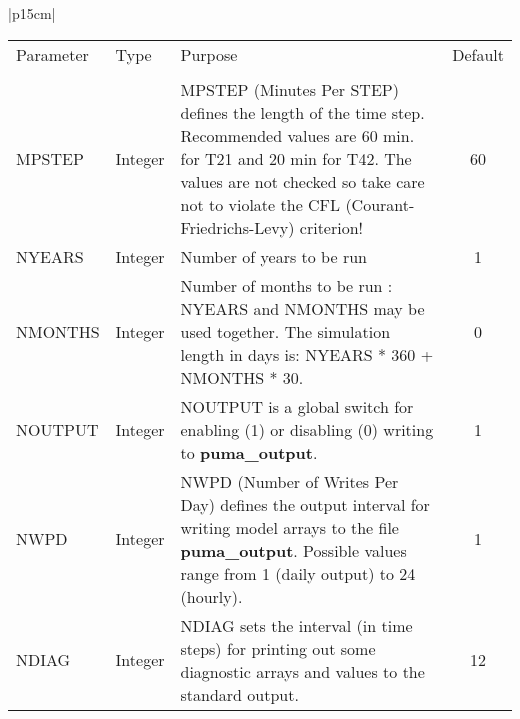\begin{center}
\begin{tabular}{|p{15cm}|}
\begin{center}
\begin{tabular}{l l p{6cm} c}
Parameter & Type & Purpose & Default \\
&&&\\
MPSTEP & Integer & MPSTEP (Minutes Per STEP) defines the length of the
                   time step. Recommended values are 60 min. for T21
                   and 20 min for T42. The values are not checked
                   so take care not to violate the CFL
                   (Courant-Friedrichs-Levy) criterion!  & 60 \\
NYEARS  & Integer & Number of years to be run & 1 \\
NMONTHS & Integer & Number of months to be run : NYEARS and NMONTHS
                    may be used together. The simulation length in
                    days is: NYEARS * 360 + NMONTHS * 30.  & 0 \\
NOUTPUT & Integer & NOUTPUT is a global switch for enabling (1)
                    or disabling (0) writing to {\bf puma\_output}.   & 1 \\
NWPD    & Integer & NWPD (Number of Writes Per Day) defines the
                    output interval for writing model arrays to the
                    file {\bf puma\_output}. Possible values range
                    from 1 (daily output) to 24 (hourly).   & 1 \\
NDIAG   & Integer & NDIAG sets the interval (in time steps) for 
                    printing out some diagnostic arrays and values
                    to the standard output.   & 12 \\
\end{tabular}
\end{center}
\vspace{3mm} \\
\hline
\end{tabular}
\end{center}

\newpage 

